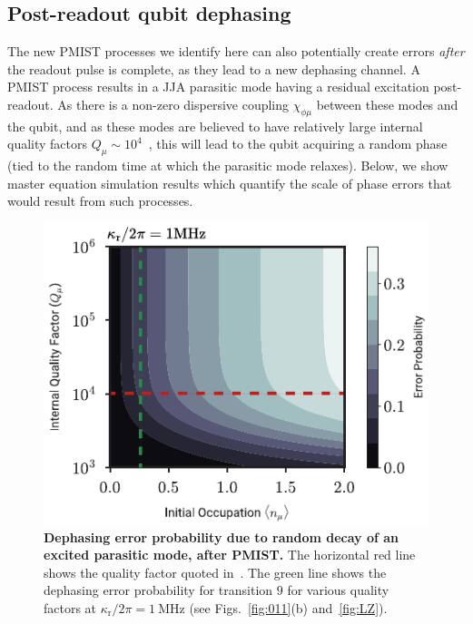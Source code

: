 \documentclass[%
reprint,
superscriptaddress,
 amsmath,amssymb,
 aps,
 prx,
longbibliography,
floatfix,
]{revtex4-2}
\begin{document}
\subsection{Post-readout qubit dephasing}\label{sec:dephasing}

The new PMIST processes we identify here can also potentially create errors \textit{after} the readout pulse is complete, as they lead to a new dephasing channel. A PMIST process results in a JJA parasitic mode having a residual excitation post-readout. As there is a non-zero dispersive coupling $\chi_{\phi\mu}$ between these modes and the qubit, and as these modes are believed to have relatively large internal quality factors $Q_\mu\sim 10^{4}$~\cite{masluk_microwave_2012, masluk2013reducing}, this will lead to the qubit acquiring a random phase (tied to the random time at which the parasitic mode relaxes). Below, we show master equation simulation results which quantify the scale of phase errors that would result from such processes.

\begin{figure}[t]
    \centering
    \includegraphics[width=\linewidth]{Figures/dephasing.pdf}
    \caption{{\bf Dephasing error probability due to random decay of an excited parasitic mode, after PMIST.} The horizontal red line shows the quality factor quoted in~\cite{masluk_microwave_2012}. The green line shows the dephasing error probability for transition $9$ for various quality factors at $\kappa_\textrm{r}/2\pi=1 \ \mathrm{MHz}$ (see Figs.~\ref{fig:011}(b) and~\ref{fig:LZ}).}
    \label{fig:dephasing}
\end{figure}
\end{document}
